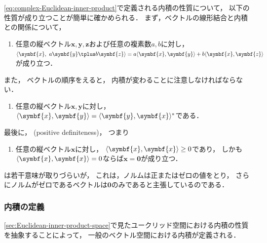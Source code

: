 \documentclass[
]{sotsu}
\newcommand{\fire}[1]{\textcolor{fire}{#1}}
\begin{document}
\quad 
\cref{eq:complex-Euclidean-inner-product}で定義される内積の性質について，
以下の性質が成り立つことが簡単に確かめられる．
まず，ベクトルの線形結合と内積との関係について，
\begin{enumerate}
    \item[\labelcref*{innerp:linear}] 
        \fire{任意の縦ベクトル$\symbf{x}, \symbf{y}, \symbf{z}$}および\fire{任意の複素数$a, b$}に対し，
        $\iparen{\symbf{x}, \  a \symbf{y} \vecplus b \symbf{z}} = a \iparen{\symbf{x}, \symbf{y}} + b \iparen{\symbf{x}, \symbf{z}}$が成り立つ．
\end{enumerate}
また，
ベクトルの順序をえると，
内積が変わることに注意しなければならない．
\begin{enumerate}
    \item[\labelcref*{innerp:conjugate-symmetry}] 
        \fire{任意の縦ベクトル$\symbf{x}, \symbf{y}$}に対し，
        $\iparen{\symbf{x}, \symbf{y}} = \conj{\iparen{\symbf{y}, \symbf{x}}}$である．
\end{enumerate}
最後に，
(positive definiteness)，
つまり
\begin{enumerate}
    \item[\labelcref*{innerp:positive-definiteness}]
        \fire{任意の縦ベクトル$\symbf{x}$}に対し，
        $\iparen{\symbf{x}, \symbf{x}} \geq 0$であり，
        しかも$\iparen{\symbf{x}, \symbf{x}} = 0$ならば$\symbf{x} = \symbf{0}$が成り立つ．
\end{enumerate}
は若干意味が取りづらいが，
これは，ノルムは正またはゼロの値をとり，
さらにノルムがゼロであるベクトルは$\symbf{0}$のみであると主張しているのである．


\subsubsection{内積の定義}
\label{sec:inner-product}

\cref{sec:Euclidean-inner-product-space}で見たユークリッド空間における内積の性質を抽象することによって，
一般のベクトル空間における内積が定義される．
\end{document}
